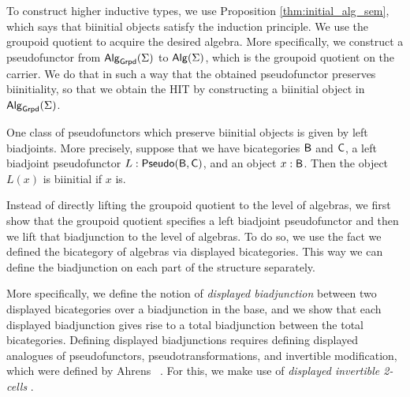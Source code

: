 To construct higher inductive types, we use Proposition \ref{thm:initial_alg_sem}, which says that biinitial objects satisfy the induction principle.
We use the groupoid quotient to acquire the desired algebra.
More specifically, we construct a pseudofunctor from $\mathsf{Alg}_{\mathsf{Grpd}}(\Sigma)$ to $\mathsf{Alg}(\Sigma)$,
which is the groupoid quotient on the carrier.
We do that in such a way that the obtained pseudofunctor preserves biinitiality,
so that we obtain the HIT by constructing a biinitial object in $\mathsf{Alg}_{\mathsf{Grpd}}(\Sigma)$.

One class of pseudofunctors which preserve biinitial objects is given by left biadjoints.
More precisely, suppose that we have bicategories $\mathsf{B}$ and $\mathsf{C}$, a left biadjoint pseudofunctor $L : \mathsf{Pseudo}(\mathsf{B}, \mathsf{C})$, and an object $x : \mathsf{B}$.
Then the object $L(x)$ is biinitial if $x$ is.

Instead of directly lifting the groupoid quotient to the level of algebras,
we first show that the groupoid quotient specifies a left biadjoint pseudofunctor and then we lift that biadjunction to the level of algebras.
To do so, we use the fact we defined the bicategory of algebras via displayed bicategories.
This way we can define the biadjunction on each part of the structure separately.

More specifically, we define the notion of \emph{displayed biadjunction} between two displayed bicategories over a biadjunction in the base,
and we show that each displayed biadjunction gives rise to a total biadjunction between the total bicategories.
Defining displayed biadjunctions requires defining displayed analogues of pseudofunctors, pseudotransformations, and invertible modification,
which were defined by Ahrens \etal \ \cite{bicatjournal}.
For this, we make use of \emph{displayed invertible 2-cells} \cite{bicatjournal}.


